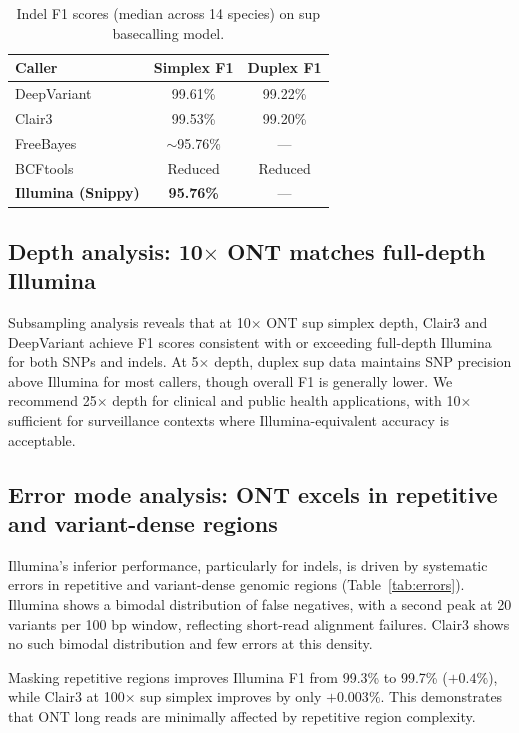 \documentclass[11pt]{article}
\begin{document}
\begin{table}[htbp]
\centering
\caption{Indel F1 scores (median across 14 species) on sup basecalling model.}
\label{tab:indel}
\begin{tabular}{@{}lcc@{}}
\toprule
Caller & Simplex F1 & Duplex F1 \\
\midrule
DeepVariant                  & 99.61\% & 99.22\% \\
Clair3                       & 99.53\% & 99.20\% \\
FreeBayes                    & $\sim$95.76\% & --- \\
BCFtools                     & Reduced & Reduced \\
\textbf{Illumina (Snippy)}  & \textbf{95.76\%} & --- \\
\bottomrule
\end{tabular}
\end{table}

\subsection{Depth analysis: 10$\times$ ONT matches full-depth Illumina}

Subsampling analysis reveals that at 10$\times$ ONT sup simplex depth, Clair3 and DeepVariant achieve F1 scores consistent with or exceeding full-depth Illumina for both SNPs and indels. At 5$\times$ depth, duplex sup data maintains SNP precision above Illumina for most callers, though overall F1 is generally lower. We recommend 25$\times$ depth for clinical and public health applications, with 10$\times$ sufficient for surveillance contexts where Illumina-equivalent accuracy is acceptable.

\subsection{Error mode analysis: ONT excels in repetitive and variant-dense regions}

Illumina's inferior performance, particularly for indels, is driven by systematic errors in repetitive and variant-dense genomic regions (Table~\ref{tab:errors}). Illumina shows a bimodal distribution of false negatives, with a second peak at 20 variants per 100 bp window, reflecting short-read alignment failures. Clair3 shows no such bimodal distribution and few errors at this density.

Masking repetitive regions improves Illumina F1 from 99.3\% to 99.7\% ($+0.4\%$), while Clair3 at 100$\times$ sup simplex improves by only $+0.003\%$. This demonstrates that ONT long reads are minimally affected by repetitive region complexity.
\end{document}
